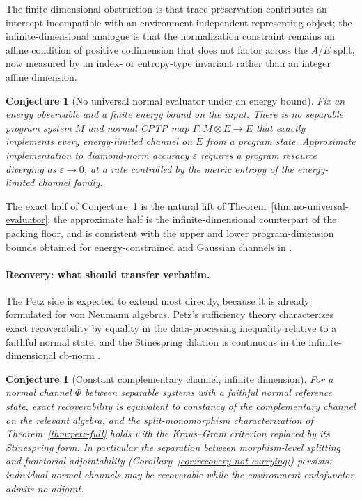 \documentclass[11pt]{article}
\newtheorem{conjecture}[theorem]{Conjecture}
\begin{document}
The finite-dimensional obstruction is that trace preservation contributes an
intercept incompatible with an environment-independent representing object; the
infinite-dimensional analogue is that the normalization constraint remains an
affine condition of positive codimension that does not factor across the
$A/E$ split, now measured by an index- or entropy-type invariant rather than an
integer affine dimension.

\begin{conjecture}[No universal normal evaluator under an energy bound]
\label{conj:infinite-evaluator}
Fix an energy observable and a finite energy bound on the input. There is no
separable program system $M$ and normal CPTP map $\Gamma:M\otimes E\to E$ that
exactly implements every energy-limited channel on $E$ from a program state.
Approximate implementation to diamond-norm accuracy $\varepsilon$ requires a
program resource diverging as $\varepsilon\to0$, at a rate controlled by the
metric entropy of the energy-limited channel family.
\end{conjecture}

The exact half of Conjecture~\ref{conj:infinite-evaluator} is the natural
lift of Theorem~\ref{thm:no-universal-evaluator}; the approximate half is the
infinite-dimensional counterpart of the packing floor, and is consistent with
the upper and lower program-dimension bounds obtained for energy-constrained and
Gaussian channels in \cite{GschwendtnerWinter2021}.

\paragraph{Recovery: what should transfer verbatim.}
The Petz side is expected to extend most directly, because it is already
formulated for von Neumann algebras. Petz's sufficiency theory
\cite{Petz1986} characterizes exact recoverability by equality in the data-processing
inequality relative to a faithful normal state, and the Stinespring dilation is
continuous in the infinite-dimensional cb-norm
\cite{KretschmannSchlingemannWerner2008}.

\begin{conjecture}[Constant complementary channel, infinite dimension]
\label{conj:infinite-petz}
For a normal channel $\Phi$ between separable systems with a faithful normal
reference state, exact recoverability is equivalent to constancy of the
complementary channel on the relevant algebra, and the split-monomorphism
characterization of Theorem~\ref{thm:petz-full} holds with the Kraus--Gram
criterion replaced by its Stinespring form. In particular the separation
between morphism-level splitting and functorial adjointability
(Corollary~\ref{cor:recovery-not-currying}) persists: individual normal channels
may be recoverable while the environment endofunctor admits no adjoint.
\end{conjecture}
\end{document}
